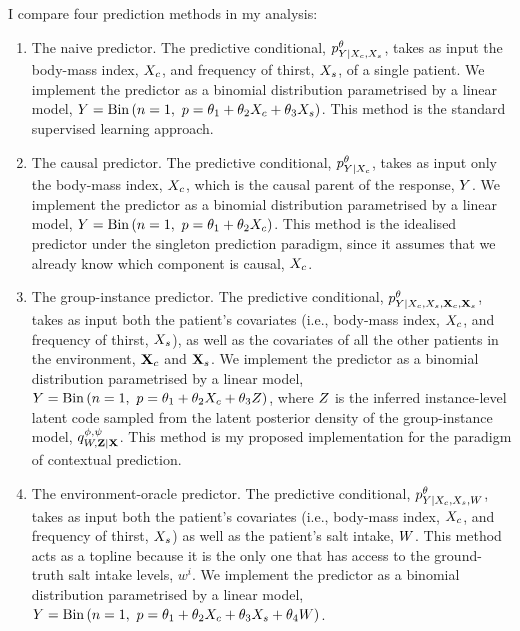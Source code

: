 \documentclass[../thesis.tex]{subfiles}
\begin{document}
I compare four prediction methods in my analysis:
\begin{enumerate}
    \item The naive predictor. The predictive conditional, $\myfunc{p}^\theta_{\myrv{y} | \myrv{x}_{c}, \myrv{x}_{s}}$, takes as input the body-mass index, $\myrv{x}_{c}$, and frequency of thirst, $\myrv{x}_{s}$, of a single patient. We implement the predictor as a binomial distribution parametrised by a linear model, $\myrv{y} = \mathrm{Bin} \left( n=1, ~ p=\theta_1 + \theta_2  \myrv{x}_{c} + \theta_3  \myrv{x}_{s} \right)$. This method is the standard supervised learning approach.
    \item The causal predictor. The predictive conditional, $\myfunc{p}^\theta_{\myrv{y} | \myrv{x}_{c}}$, takes as input only the body-mass index, $\myrv{x}_{c}$, which is the causal parent of the response, $\myrv{y}$. We implement the predictor as a binomial distribution parametrised by a linear model, $\myrv{y} = \mathrm{Bin} \left( n=1, ~ p=\theta_1 + \theta_2  \myrv{x}_{c} \right)$.  This method is the idealised predictor under the singleton prediction paradigm, since it assumes that we already know which component is causal, $\myrv{x}_c$.
    \item The group-instance predictor. The predictive conditional, $\myfunc{p}^\theta_{\myrv{y} | \myrv{x}_{c}, \myrv{x}_{s}, \mygroup{\myrv{x}}_{c}, \mygroup{\myrv{x}}_{s}}$, takes as input both the patient's covariates (i.e., body-mass index, $\myrv{x}_{c}$, and frequency of thirst, $\myrv{x}_{s}$), as well as the covariates of all the other patients in the environment, $\mygroup{\myrv{x}}_{c}$ and $\mygroup{\myrv{x}}_{s}$. We implement the predictor as a binomial distribution parametrised by a linear model, $\myrv{y} = \mathrm{Bin} \left( n=1, ~ p=\theta_1 + \theta_2  \myrv{x}_{c} + \theta_3  \myrv{z} \right)$, where $\myrv{z}$ is the inferred instance-level latent code sampled from the latent posterior density of the group-instance model, $\myfunc{q}^{\phi, \psi}_{\myrv{w}, \mygroup{\myrv{z}} | \mygroup{\myrv{x}}}$. This method is my proposed implementation for the paradigm of contextual prediction.
    \item The environment-oracle predictor. The predictive conditional, $\myfunc{p}^\theta_{\myrv{y} | \myrv{x}_{c}, \myrv{x}_{s}, \myrv{w}}$, takes as input both the patient's covariates (i.e., body-mass index, $\myrv{x}_{c}$, and frequency of thirst, $\myrv{x}_{s}$) as well as the patient's salt intake, $\myrv{w}$. This method acts as a topline because it is the only one that has access to the ground-truth salt intake levels, $w^i$. We implement the predictor as a binomial distribution parametrised by a linear model, $\myrv{y} = \mathrm{Bin} \left( n=1, ~ p=\theta_1 + \theta_2  \myrv{x}_{c} + \theta_3  \myrv{x}_{s} + \theta_4  \myrv{w} \right)$. 
\end{enumerate}
\end{document}

